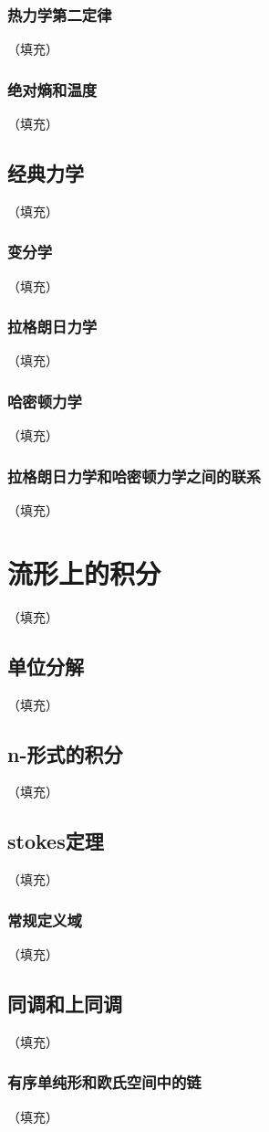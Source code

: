 \documentclass[hyperref,UTF8]{ctexbook}
\begin{document}
\subsection{热力学第二定律}（填充）
\subsection{绝对熵和温度}（填充）
\section{经典力学}（填充）
\subsection{变分学}（填充）
\subsection{拉格朗日力学}（填充）
\subsection{哈密顿力学}（填充）
\subsection{拉格朗日力学和哈密顿力学之间的联系}（填充）
\chapter{流形上的积分}（填充）
\section{单位分解}（填充）
\section{n-形式的积分}（填充）
\section{stokes定理}（填充）
\subsection{常规定义域}（填充）
\section{同调和上同调}（填充）
\subsection{有序单纯形和欧氏空间中的链}（填充）
\end{document}
